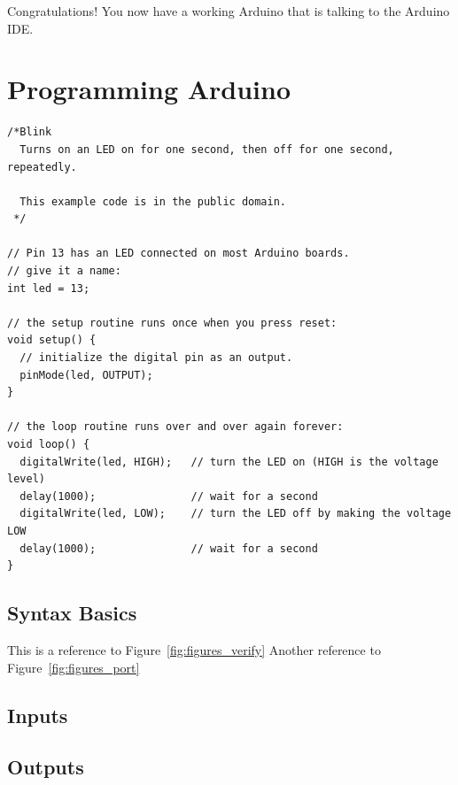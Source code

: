 \documentclass[11pt,a4paper]{article}
\begin{document}

Congratulations!  You now have a working Arduino that is talking to the Arduino IDE.



\section{Programming Arduino} %
\label{sec:programming_arduino}

\begin{verbatim}
/*Blink
  Turns on an LED on for one second, then off for one second, repeatedly.
 
  This example code is in the public domain.
 */
 
// Pin 13 has an LED connected on most Arduino boards.
// give it a name:
int led = 13;

// the setup routine runs once when you press reset:
void setup() {                
  // initialize the digital pin as an output.
  pinMode(led, OUTPUT);     
}

// the loop routine runs over and over again forever:
void loop() {
  digitalWrite(led, HIGH);   // turn the LED on (HIGH is the voltage level)
  delay(1000);               // wait for a second
  digitalWrite(led, LOW);    // turn the LED off by making the voltage LOW
  delay(1000);               // wait for a second
}\end{verbatim}

\subsection{Syntax Basics} %
\label{sub:syntax_basics}

This is a reference to Figure~\ref{fig:figures_verify}
Another reference to Figure~\ref{fig:figures_port}


\subsection{Inputs} %
\label{sub:inputs}


\subsection{Outputs} %
\label{sub:available_hardware}





 
 \nocite{*}
\end{document}
